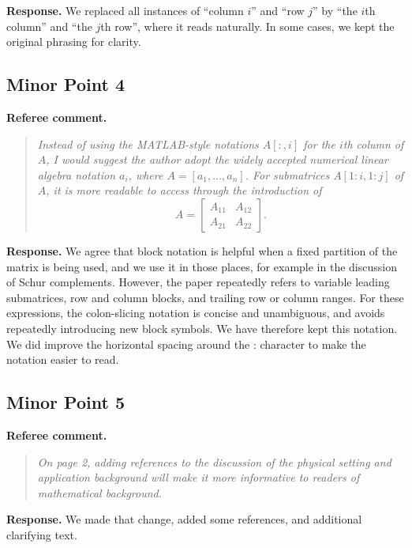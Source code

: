 \documentclass[11pt]{article}
\newenvironment{refereecomment}
{\par\smallskip\noindent\textbf{\color{commentblue}Referee comment.}
\begin{quote}\itshape}
  {
\end{quote}}
\newenvironment{authorresponse}
{\par\smallskip\noindent\textbf{\color{responsegreen}Response.}}
{\par\smallskip}
\begin{document}
\begin{authorresponse}
  We replaced all instances of ``column $i$'' and ``row $j$'' by ``the $i$th column'' and ``the $j$th row'', where it reads naturally. In some cases, we kept the original phrasing for clarity.
\end{authorresponse}

\subsection*{Minor Point 4}

\begin{refereecomment}
  Instead of using the MATLAB-style notations $A[:,i]$ for the $i$th column of $A$, I would suggest the author adopt the widely accepted numerical linear algebra notation $a_i$, where $A = [a_1, \ldots, a_n]$. For submatrices $A[1:i, 1:j]$ of $A$, it is more readable to access through the introduction of
  \[
    A =
    \begin{bmatrix}
      A_{11} & A_{12} \\
      A_{21} & A_{22}
    \end{bmatrix}.
  \]
\end{refereecomment}

\begin{authorresponse}
  We agree that block notation is helpful when a fixed partition of the matrix is being used, and we use it in those places, for example in the discussion of Schur complements. However, the paper repeatedly refers to variable leading submatrices, row and column blocks, and trailing row or column ranges. For these expressions, the colon-slicing notation is concise and unambiguous, and avoids repeatedly introducing new block symbols. We have therefore kept this notation. We did improve the horizontal spacing around the : character to make the notation easier to read.
\end{authorresponse}

\subsection*{Minor Point 5}

\begin{refereecomment}
  On page 2, adding references to the discussion of the physical setting and application background will make it more informative to readers of mathematical background.
\end{refereecomment}

\begin{authorresponse}
  We made that change, added some references, and additional clarifying text.
\end{authorresponse}
\end{document}
